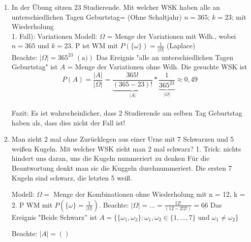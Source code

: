 \documentclass[10pt,a4paper,titlepage]{book}
\begin{document}
\begin{enumerate}
\item In der Übung sitzen 23 Studierende. Mit welcher WSK haben alle an unterschiedlichen Tagen Geburtstag= (Ohne Schaltjahr)
$n = 365$; $k=23$; mit Wiederholung\\
1. Fall): Variationen
Modell: $\Omega$ = Menge der Variationen mit Wdh., wobei $n =365$ und $k=23$. P ist WM mit $P(\{\omega\})=\frac{1}{|\Omega|}$ (Laplace)\\
Beachte: $|\Omega| = 365^{23}$ $(\text{a)})$
Das Ereignis "alle an unterschiedlichen Tagen Geburtstag" ist $A$ = Menge der Variationen ohne Wdh.
Die gesuchte WSK ist $$P(A)=\frac{|A|}{|\Omega|}=\underbrace{\frac{365!}{(365-23)!}}_{|A|}*\underbrace{\frac{1}{365^{23}}}_{|\Omega|}\approx 0,49$$\\
Fazit: Es ist wahrscheinlicher, dass 2 Studierende am selben Tag Geburtstag haben als, dass dies nicht der Fall ist!
\item Man zieht 2 mal ohne Zurücklegen aus einer Urne mit 7 Schwarzen und 5 weißen Kugeln. Mit welcher WSK zieht man 2 mal schwarz?
1. Trick: nichts hindert uns daran, uns die Kugeln nummeriert zu denken
Für die Beantwortung denkt man sic die Kuggeln durchnummeriert. Die ersten 7 Kugeln sind schwarz, die letzten 5 weiß.

Modell:
$\Omega = $ Menge der Kombinationen ohne Wiederholung mit n = 12, k = 2. P WM mit $P(\{\omega\} = \frac{1}{|\Omega|})$.
Beachte: $|\Omega| = ... = \frac{12!}{(12-2! 2!)} = \underline{66}$
Das Ereignis "Beide Schwarz” ist $A=\{\{\omega_1, \omega_2\}: \omega_1, \omega
_2 \in \{1, ..., 7\} \text{ und } \omega_1 \neq \omega_2\}$

Beachte: $|A| = ()$
\end{enumerate}
\end{document}

